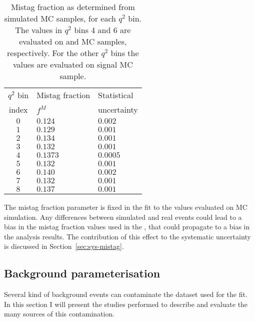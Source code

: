 \begin{table}[!htb]
  \begin{center}
      \caption{Mistag fraction as determined from simulated MC samples, for each $q^2$ bin.
        The values in $q^2$ bins 4 and 6 are evaluated on \BtoKstJpsimumu and \BtoKstpsipmumu MC samples, respectively. For the other $q^2$ bins the values are evaluated on signal MC sample.
        \label{tab:Mis tag fraction}}
      \begin{tabular}{c|l|l}
        $q^2$ bin & Mistag fraction & Statistical \\
        index     & $f^M$           & uncertainty \\
        \hline
        $0$ & $0.124$  & $0.002$  \\
        $1$ & $0.129$  & $0.001$  \\
        $2$ & $0.134$  & $0.001$  \\
        $3$ & $0.132$  & $0.001$  \\
        $4$ & $0.1373$ & $0.0005$ \\
        $5$ & $0.132$  & $0.001$  \\
        $6$ & $0.140$  & $0.002$  \\
        $7$ & $0.132$  & $0.001$  \\
        $8$ & $0.137$  & $0.001$  \\
      \end{tabular}
  \end{center}
\end{table}

The mistag fraction parameter is fixed in the fit to the values evaluated on MC simulation.
Any differences between simulated and real events could lead to a bias in the mistag fraction values used in the \pdf, that could propagate to a bias in the analysis results.
The contribution of this effect to the systematic uncertainty is discussed in Section~\ref{sec:sys-mistag}.

\subsection{Background parameterisation}
\label{sec:backg}

Several kind of background events can contaminate the dataset used for the fit.
In this section I will present the studies performed to describe and evaluate the many sources of this contamination.

